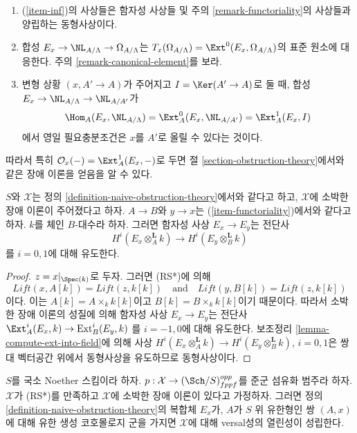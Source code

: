 \begin{definition}
\begin{enumerate}
\item[(iii)]
(\ref{item-inf})의 사상들은 함자성 사상들 및 주의
\ref{remark-functoriality}의 사상들과 양립하는 동형사상이다.
\item[(iv)]
합성 $E_x \to \NL_{A/\Lambda} \to \Omega_{A/\Lambda}$는
$T_x(\Omega_{A/\Lambda}) = \Ext^0(E_x, \Omega_{A/\Lambda})$의
표준 원소에 대응한다. 주의 \ref{remark-canonical-element}를 보라.
\item[(v)]
변형 상황 $(x, A' \to A)$가 주어지고 $I = \Ker(A' \to A)$로 둘 때,
합성 $E_x \to \NL_{A/\Lambda} \to \NL_{A/A'}$가
$$
\Hom_A(E_x, \NL_{A/\Lambda}) = \Ext^0_A(E_x, \NL_{A/A'}) =
\Ext^1_A(E_x, I)
$$
에서 영일 필요충분조건은 $x$를 $A'$로 올릴 수 있다는 것이다.
\end{enumerate}
\end{definition}

\noindent
따라서 특히 $\mathcal{O}_x( - ) = \Ext^1_A(E_x, -)$로 두면
절 \ref{section-obstruction-theory}에서와 같은 장애 이론을 얻음을 알 수 있다.

\begin{lemma}
\label{lemma-naive-obstruction-theory-qis}
$S$와 $\mathcal{X}$는 정의 \ref{definition-naive-obstruction-theory}에서와
같다고 하고, $\mathcal{X}$에 소박한 장애 이론이 주어졌다고 하자.
$A \to B$와 $y \to x$는 (\ref{item-functoriality})에서와 같다고 하자.
$k$를 체인 $B$-대수라 하자. 그러면 함자성 사상 $E_x \to E_y$는 전단사
$$
H^i(E_x \otimes_A^{\mathbf{L}} k) \to H^i(E_y \otimes_B^{\mathbf{L}} k)
$$
를 $i = 0, 1$에 대해 유도한다.
\end{lemma}

\begin{proof}
$z = x|_{\Spec(k)}$로 두자. 그러면 (RS*)에 의해
$$
\textit{Lift}(x, A[k]) = \textit{Lift}(z, k[k])
\quad\text{and}\quad
\textit{Lift}(y, B[k]) = \textit{Lift}(z, k[k])
$$
이다. 이는 $A[k] = A \times_k k[k]$이고 $B[k] = B \times_k k[k]$이기 때문이다.
따라서 소박한 장애 이론의 성질에 의해 함자성 사상 $E_x \to E_y$는
전단사
$\Ext^i_A(E_x, k) \to \text{Ext}^i_B(E_y, k)$
를 $i = -1, 0$에 대해 유도한다.
보조정리 \ref{lemma-compute-ext-into-field}에 의해 사상
$H^i(E_x \otimes_A^{\mathbf{L}} k) \to H^i(E_y \otimes_B^{\mathbf{L}} k)$,
$i = 0, 1$은 쌍대 벡터공간 위에서 동형사상을 유도하므로 동형사상이다.
\end{proof}

\begin{lemma}
\label{lemma-naive-obstruction-theory-gives-openness}
$S$를 국소 Noether 스킴이라 하자.
$p : \mathcal{X} \to (\Sch/S)_{fppf}^{opp}$를 준군 섬유화 범주라 하자.
$\mathcal{X}$가 (RS*)를 만족하고 $\mathcal{X}$에 소박한 장애 이론이
있다고 가정하자. 그러면 정의 \ref{definition-naive-obstruction-theory}의
복합체 $E_x$가, $A$가 $S$ 위 유한형인 쌍 $(A, x)$에 대해 유한 생성
코호몰로지 군을 가지면 $\mathcal{X}$에 대해 versal성의 열린성이 성립한다.
\end{lemma}

